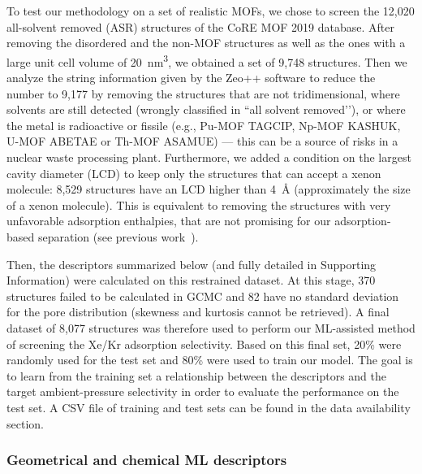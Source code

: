 \documentclass[main]{subfiles}
\begin{document}
To test our methodology on a set of realistic MOFs, we chose to screen the 12,020 all-solvent removed (ASR) structures of the CoRE MOF 2019 database\autocite{Chung_2019}. After removing the disordered and the non-MOF structures as well as the ones with a large unit cell volume of \SI{20}{\cubic\nano\meter}, we obtained a set of 9,748 structures. Then we analyze the string information given by the Zeo++ software\autocite{zeopp_Willems2012} to reduce the number to 9,177 by removing the structures that are not tridimensional, where solvents are still detected (wrongly classified in ``all solvent removed’’), or where the metal is radioactive or fissile (e.g., Pu-MOF TAGCIP\autocite{Diwu_2010}, Np-MOF KASHUK\autocite{Martin_2017}, U-MOF ABETAE\autocite{Jouffret_2011} or Th-MOF ASAMUE\autocite{Liang_2016}) --- this can be a source of risks in a nuclear waste processing plant. Furthermore, we added a condition on the largest cavity diameter (LCD) to keep only the structures that can accept a xenon molecule: 8,529 structures have an LCD higher than \SI{4}{\angstrom} (approximately the size of a xenon molecule). This is equivalent to removing the structures with very unfavorable adsorption enthalpies, that are not promising for our adsorption-based separation (see previous work~\autocite{Ren_2023}).

Then, the descriptors summarized below (and fully detailed in Supporting Information) were calculated on this restrained dataset. At this stage, 370 structures failed to be calculated in GCMC and 82 have no standard deviation for the pore distribution (skewness and kurtosis cannot be retrieved). A final dataset of 8,077 structures was therefore used to perform our ML-assisted method of screening the Xe/Kr adsorption selectivity. Based on this final set, {20\%} were randomly used for the test set and {80\%} were used to train our model. The goal is to learn from the training set a relationship between the descriptors and the target ambient-pressure selectivity in order to evaluate the performance on the test set. A CSV file of training and test sets can be found in the data availability section.

\subsubsection{Geometrical and chemical ML descriptors}
\end{document}
